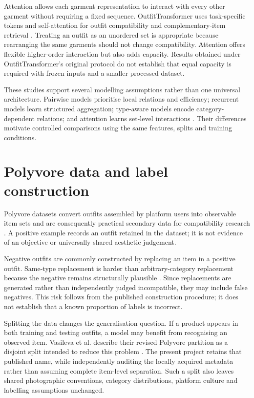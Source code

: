 Attention allows each garment representation to interact with every other
garment without requiring a fixed sequence. OutfitTransformer uses task-specific
tokens and self-attention for outfit compatibility and complementary-item
retrieval \parencite{sarkar2023outfittransformer}. Treating an outfit as an
unordered set is appropriate because rearranging the same garments should not
change compatibility. Attention offers flexible higher-order interaction but
also adds capacity. Results obtained under OutfitTransformer's original
protocol do not establish that equal capacity is required with frozen inputs
and a smaller processed dataset.

These studies support several modelling assumptions rather than one universal
architecture. Pairwise models prioritise local relations and efficiency;
recurrent models learn structured aggregation; type-aware models encode
category-dependent relations; and attention learns set-level interactions
\parencite{han2017bilstm,vasileva2018typeaware,sarkar2023outfittransformer}.
Their differences motivate controlled comparisons using the same features,
splits and training conditions.

\section{Polyvore data and label construction}

Polyvore datasets convert outfits assembled by platform users into observable
item sets and are consequently practical secondary data for compatibility
research \parencite{han2017bilstm,vasileva2018typeaware}. A positive example
records an outfit retained in the dataset; it is not evidence of an objective
or universally shared aesthetic judgement.

Negative outfits are commonly constructed by replacing an item in a positive
outfit. Same-type replacement is harder than arbitrary-category replacement
because the negative remains structurally plausible
\parencite{vasileva2018typeaware}. Since replacements are generated rather than
independently judged incompatible, they may include false negatives. This risk
follows from the published construction procedure; it does not establish that
a known proportion of labels is incorrect.

Splitting the data changes the generalisation question. If a product appears in
both training and testing outfits, a model may benefit from recognising an
observed item. Vasileva et al. describe their revised Polyvore partition as a
disjoint split intended to reduce this problem
\parencite{vasileva2018typeaware}. The present project retains that published
name, while independently auditing the locally acquired metadata rather than
assuming complete item-level separation. Such a split also leaves shared
photographic conventions, category distributions, platform culture and
labelling assumptions unchanged.

